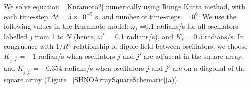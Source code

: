 \documentclass[10pt]{article}
\begin{document}
We solve equation ~\ref{Kuramoto2} numerically using Runge Kutta method, with each time-step $\Delta t=5 \times 10^{-5}$ s, and number of time-steps =$10^{6}$. We use the following values in the Kuramoto model: $\omega_j$ =0.1 radians/s for all oscillators labelled $j$ from 1 to $N$ (hence, $\omega^{*}$ = 0.1 radians/s), and $K_{s}=0.5$ radians/s. In congruence with $1/R^3$ relationship of dipole field between oscillators, we choose $K_{j, j^{\prime}} = -1$ radian/s  when oscillators $j$ and $j'$ are adjacent in the square array, and $K_{j, j^{\prime}}=-0.354$ radians/s   when oscillators $j$ and $j'$ are on a diagonal of the square array (Figure ~\ref{SHNOArraySquareSchematic}(a)). 










\end{document}
